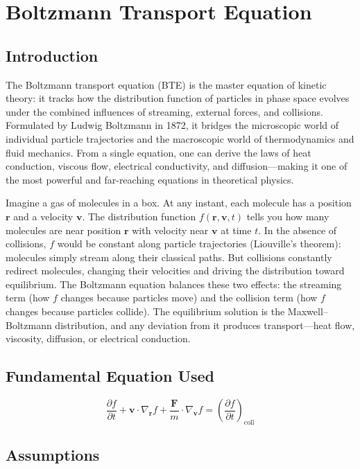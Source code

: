 \chapter{Boltzmann Transport Equation}

\section*{Introduction}

The Boltzmann transport equation (BTE) is the master equation of kinetic theory: it tracks how the distribution function of particles in phase space evolves under the combined influences of streaming, external forces, and collisions. Formulated by Ludwig Boltzmann in 1872, it bridges the microscopic world of individual particle trajectories and the macroscopic world of thermodynamics and fluid mechanics. From a single equation, one can derive the laws of heat conduction, viscous flow, electrical conductivity, and diffusion---making it one of the most powerful and far-reaching equations in theoretical physics.

Imagine a gas of molecules in a box. At any instant, each molecule has a position $\mathbf{r}$ and a velocity $\mathbf{v}$. The distribution function $f(\mathbf{r}, \mathbf{v}, t)$ tells you how many molecules are near position $\mathbf{r}$ with velocity near $\mathbf{v}$ at time $t$. In the absence of collisions, $f$ would be constant along particle trajectories (Liouville's theorem): molecules simply stream along their classical paths. But collisions constantly redirect molecules, changing their velocities and driving the distribution toward equilibrium. The Boltzmann equation balances these two effects: the streaming term (how $f$ changes because particles move) and the collision term (how $f$ changes because particles collide). The equilibrium solution is the Maxwell--Boltzmann distribution, and any deviation from it produces transport---heat flow, viscosity, diffusion, or electrical conduction.
\section*{Fundamental Equation Used}

\begin{equation}
\frac{\partial f}{\partial t} + \mathbf{v}\cdot\nabla_{\mathbf{r}} f + \frac{\mathbf{F}}{m}\cdot\nabla_{\mathbf{v}} f = \left(\frac{\partial f}{\partial t}\right)_{\text{coll}}
\end{equation}
\section*{Assumptions}


